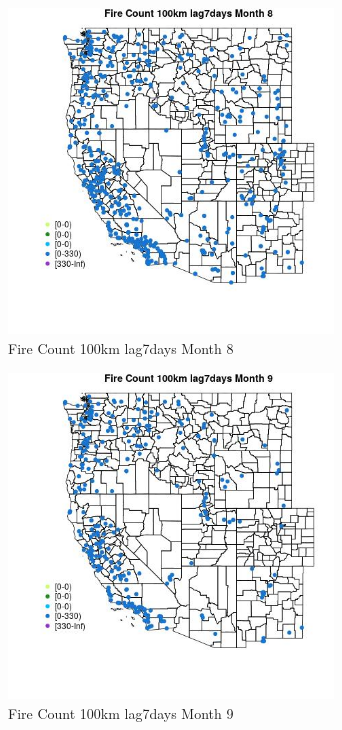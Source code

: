 \begin{figure} 
\centering  
\includegraphics[width=0.77\textwidth]{Code_Outputs/Report_ML_input_PM25_Step4_part_e_de_duplicated_aves_compiled_2019-05-18wNAs_MapObsMo8Fire_Count_100km_lag7days.jpg} 
\caption{\label{fig:Report_ML_input_PM25_Step4_part_e_de_duplicated_aves_compiled_2019-05-18wNAsMapObsMo8Fire_Count_100km_lag7days}Fire Count 100km lag7days Month 8} 
\end{figure} 
 

\begin{figure} 
\centering  
\includegraphics[width=0.77\textwidth]{Code_Outputs/Report_ML_input_PM25_Step4_part_e_de_duplicated_aves_compiled_2019-05-18wNAs_MapObsMo9Fire_Count_100km_lag7days.jpg} 
\caption{\label{fig:Report_ML_input_PM25_Step4_part_e_de_duplicated_aves_compiled_2019-05-18wNAsMapObsMo9Fire_Count_100km_lag7days}Fire Count 100km lag7days Month 9} 
\end{figure} 
 

